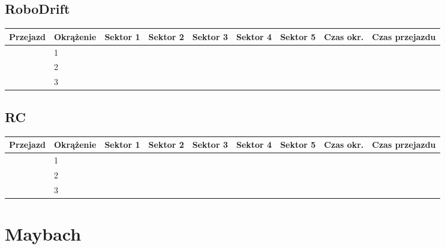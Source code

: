 \documentclass[11pt]{article}
\begin{document}
\subsection{RoboDrift}
\begin{table}[h]
\begin{tabular}{|l|l|l|l|l|l|l|l|l|}
\hline
   Przejazd        & Okrążenie & Sektor 1 & Sektor 2 & Sektor 3 & Sektor 4 & Sektor 5 & Czas okr. & Czas przejazdu    \\ \hline
\multirow{3}{*}{} & 1         &          &          &          &          &          &           & \multirow{3}{*}{} \\ \cline{2-8}
                   & 2         &          &          &          &          &          &           &                  \\ \cline{2-8}
                   & 3         &          &          &          &          &          &           &                   \\ \hline
\end{tabular}
\end{table}
\subsection{RC}
\begin{table}[h]
\begin{tabular}{|l|l|l|l|l|l|l|l|l|}
\hline
   Przejazd        & Okrążenie & Sektor 1 & Sektor 2 & Sektor 3 & Sektor 4 & Sektor 5 & Czas okr. & Czas przejazdu    \\ \hline
\multirow{3}{*}{} & 1         &          &          &          &          &          &           & \multirow{3}{*}{} \\ \cline{2-8}
                   & 2         &          &          &          &          &          &           &                  \\ \cline{2-8}
                   & 3         &          &          &          &          &          &           &                   \\ \hline
\end{tabular}
\end{table}
\pagebreak
\section{Maybach}
\end{document}
